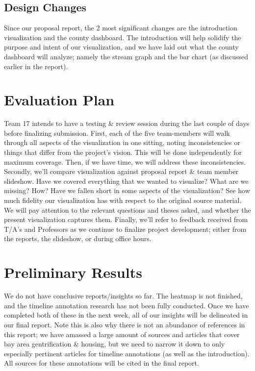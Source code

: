 \documentclass{article}
\begin{document}
\subsection{Design Changes}

Since our proposal report, the 2 most significant changes are the introduction visualization and the county dashboard. The introduction will help solidify the purpose and intent of our visualization, and we have laid out what the county dashboard will analyze; namely the stream graph and the bar chart (as discussed earlier in the report).

\section{Evaluation Plan}

Team 17 intends to have a testing \& review session during the last couple of days before finalizing submission. First, each of the five team-members will walk through all aspects of the visualization in one sitting, noting inconsistencies or things that differ from the project's vision. This will be done independently for maximum coverage. Then, if we have time, we will address these inconsistencies. Secondly, we'll compare visualization against proposal report \& team member slideshow. Have we covered everything that we wanted to visualize? What are we missing? How? Have we fallen short in some aspects of the visualization? See how much fidelity our visualization has with respect to the original source material. We will pay attention to the relevant questions and theses asked, and whether the present visualization captures them. Finally, we'll refer to feedback received from T/A's and Professors as we continue to finalize project development; either from the reports, the slideshow, or during office hours.
    
\section{Preliminary Results}

We do not have conclusive reports/insights so far. The heatmap is not finished, and the timeline annotation research has not been fully conducted. Once we have completed both of these in the next week, all of our insights will be delineated in our final report. Note this is also why there is not an abundance of references in this report; we have amassed a large amount of sources and articles that cover bay area gentrification \& housing, but we need to narrow it down to only especially pertinent articles for timeline annotations (as well as the introduction). All sources for these annotations will be cited in the final report. 
\end{document}
